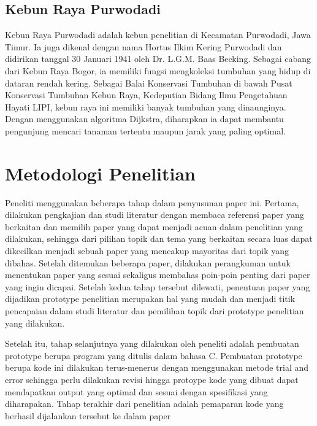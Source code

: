 \documentclass[conference]{IEEEtran}
\begin{document}
\subsection{Kebun Raya Purwodadi}
Kebun Raya Purwodadi adalah kebun penelitian di Kecamatan Purwodadi, Jawa Timur. Ia juga dikenal dengan nama Hortus Ilkim Kering Purwodadi dan didirikan tanggal 30 Januari 1941 oleh Dr. L.G.M. Baas Becking. Sebagai cabang dari Kebun Raya Bogor, ia memiliki fungsi mengkoleksi tumbuhan yang hidup di dataran rendah kering. Sebagai Balai Konservasi Tumbuhan di bawah Pusat Konservasi Tumbuhan Kebun Raya, Kedeputian Bidang Ilmu Pengetahuan Hayati LIPI, kebun raya ini memiliki banyak tumbuhan yang dinaunginya. Dengan menggunakan algoritma Dijkstra, 
diharapkan ia dapat membantu pengunjung mencari tanaman tertentu maupun jarak yang paling optimal.

\section{Metodologi Penelitian}
Peneliti menggunakan beberapa tahap dalam penyusunan paper ini. Pertama, dilakukan pengkajian dan studi literatur dengan membaca referensi paper yang berkaitan dan memilih paper yang dapat menjadi acuan dalam penelitian yang dilakukan, sehingga dari pilihan topik dan tema yang berkaitan secara luas dapat dikecilkan menjadi sebuah paper yang mencakup mayoritas dari topik yang dibahas. Setelah ditemukan beberapa paper, dilakukan perangkuman untuk menentukan paper yang sesuai 
sekaligus membahas poin-poin penting dari paper yang ingin dicapai. Setelah kedua tahap tersebut dilewati, penentuan paper yang dijadikan prototype penelitian merupakan hal yang mudah dan menjadi titik pencapaian dalam studi literatur dan pemilihan topik dari prototype penelitian yang dilakukan. 

Setelah itu, tahap selanjutnya yang dilakukan oleh peneliti adalah pembuatan prototype berupa program yang ditulis dalam bahasa C. Pembuatan prototype berupa kode ini dilakukan terus-menerus dengan menggunakan metode trial and error sehingga perlu dilakukan revisi hingga protoype kode yang dibuat dapat mendapatkan output yang optimal dan sesuai dengan spesifikasi yang diharapakan. Tahap terakhir dari penelitian adalah pemaparan kode yang berhasil dijalankan tersebut ke dalam paper
\begin{center}
    \end{center}
\end{document}
